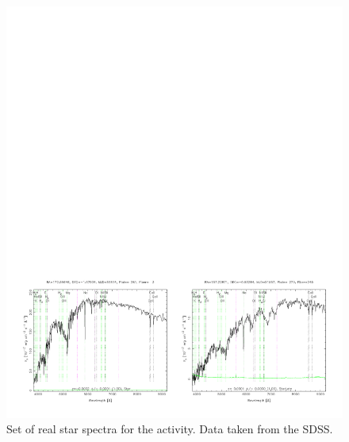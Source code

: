 \documentclass{tufte-handout}
\begin{document}
\begin{fullwidth}
\begin{figure}
  \includegraphics[width=2.0\columnwidth]{figures_activity4/spectra3.pdf}
  \caption{Set of real star spectra for the activity. Data taken from the SDSS.}
  \label{fig:spectra3}
\end{figure}

\end{fullwidth}

\end{document}
